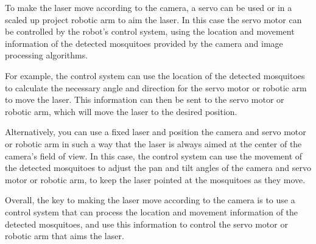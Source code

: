 \documentclass[11pt]{article}
\begin{document}
To make the laser move according to the camera, a servo can be used or in a scaled up project robotic arm to aim the laser. In this case the servo motor can be controlled by the robot's control system, using the location and movement information of the detected mosquitoes provided by the camera and image processing algorithms.

For example, the control system can use the location of the detected mosquitoes to calculate the necessary angle and direction for the servo motor or robotic arm to move the laser. This information can then be sent to the servo motor or robotic arm, which will move the laser to the desired position.

Alternatively, you can use a fixed laser and position the camera and servo motor or robotic arm in such a way that the laser is always aimed at the center of the camera's field of view. In this case, the control system can use the movement of the detected mosquitoes to adjust the pan and tilt angles of the camera and servo motor or robotic arm, to keep the laser pointed at the mosquitoes as they move.

Overall, the key to making the laser move according to the camera is to use a control system that can process the location and movement information of the detected mosquitoes, and use this information to control the servo motor or robotic arm that aims the laser.








	

	
	
\end{document}
